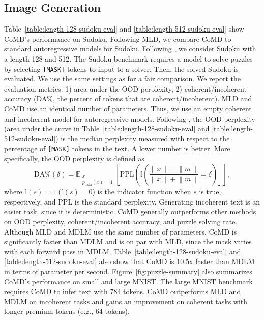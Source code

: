 \subsection{Image Generation}
Table~\ref{table:length-128-sudoku-eval} and \ref{table:length-512-sudoku-eval} show CoMD's performance on Sudoku. Following MLD, we compare CoMD to standard autoregressive models for Sudoku. Following \citet{coja2020replica}, we consider Sudoku with a length 128 and 512. The Sudoku benchmark requires a model to solve puzzles by selecting \texttt{[MASK]} tokens to input to a solver. Then, the solved Sudoku is evaluated. We use the same settings as \citet{coja2020replica} for a fair comparison. We report the evaluation metrics: 1) area under the OOD perplexity, 2) coherent/incoherent accuracy (DA\%, the percent of tokens that are coherent/incoherent). MLD and CoMD use an identical number of parameters. Thus, we use an empty coherent and incoherent model for autoregressive models. Following \citet{coja2020replica}, the OOD perplexity (area under the curve in Table~\ref{table:length-128-sudoku-eval} and \ref{table:length-512-sudoku-eval}) is the median perplexity measured with respect to the percentage of \texttt{[MASK]} tokens in the text. A lower number is better. More specifically, the OOD perplexity is defined as
\begin{equation}
\mathrm{DA}\%\left(\delta\right)=\mathbb E_{\substack{x\\ p_{\mathrm{data}}(x)=1}}\left[\mathrm{PPL}\left(\mathbb I\left(\frac{\left\|x\right\|-\left\|m\right\|}{\left\|x\right\|+\left\|m\right\|}=\delta\right)\right]\right],
\end{equation}
where $\mathbb I\left(s\right)=1$ ($\mathbb I\left(s\right)=0$) is the indicator function when $s$ is true, respectively, and $\mathrm{PPL}$ is the standard perplexity.
Generating incoherent text is an easier task, since it is deterministic. CoMD generally outperforms other methods on OOD perplexity, coherent/incoherent accuracy, and puzzle solving rate. Although MLD and MDLM use the same number of parameters, CoMD is significantly faster than MDLM and is on par with MLD, since the mask varies with each forward pass in MDLM. Table~\ref{table:length-128-sudoku-eval} and \ref{table:length-512-sudoku-eval} also show that CoMD is 10.5x faster than MDLM in terms of parameter per second. Figure~\ref{fig:puzzle-summary} also summarizes CoMD's performance on small and large MNIST. The large MNIST benchmark requires CoMD to infer text with 784 tokens. CoMD outperforms MLD and MDLM on incoherent tasks and gains an improvement on coherent tasks with longer premium tokens (e.g., 64 tokens). 

